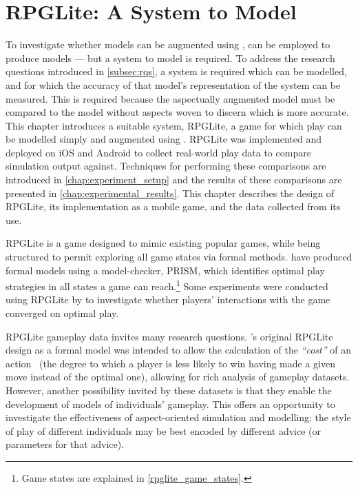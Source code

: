 \chapter{RPGLite: A System to Model}\label{chap:rpglite}


To investigate whether models can be augmented using \aop{}, \pdsfthree{} can be
employed to produce \aspectoriented{} models --- but a system to model is
required. To address the research questions introduced in \cref{subsec:rqs}, a
system is required which can be modelled, and for which the accuracy of that
model's representation of the system can be measured. This is required because
the aspectually augmented model must be compared to the model without aspects
woven to discern which is more accurate. This chapter introduces a suitable
system, RPGLite, a game for which play can be modelled simply and augmented
using \aop{}. RPGLite was implemented and deployed on iOS and Android to collect
real-world play data to compare simulation output against. Techniques for
performing these comparisons are introduced in \cref{chap:experiment_setup} and
the results of these comparisons are presented in
\cref{chap:experimental_results}. This chapter describes the design of RPGLite,
its implementation as a mobile game, and the data collected from its use.

RPGLite is a game designed to mimic existing popular games, while being
structured to permit exploring all game states via formal methods.
\citet{kavanagh2020} have produced formal models using a model-checker, PRISM,
which identifies optimal play strategies in all states a game can
reach.\footnote{Game states are explained in \cref{rpglite_game_states}.} Some
experiments were conducted using RPGLite by \citet{kavanagh2021thesis} to
investigate whether players' interactions with the game converged on optimal
play.

RPGLite gameplay data invites many research questions.
\citeauthor{kavanagh2020}'s original RPGLite design as a formal model was
intended to allow the calculation of the \emph{``cost''} of an
action~\cite{kavanagh2020,kavanagh2021thesis} (the degree to which a player is
less likely to win having made a given move instead of the optimal one),
allowing for rich analysis of gameplay datasets. However, another possibility
invited by these datasets is that they enable the development of models of
individuals' gameplay. This offers an opportunity to investigate the
effectiveness of aspect-oriented simulation and modelling: the style of play of
different individuals may be best encoded by different advice (or parameters for
that advice).

